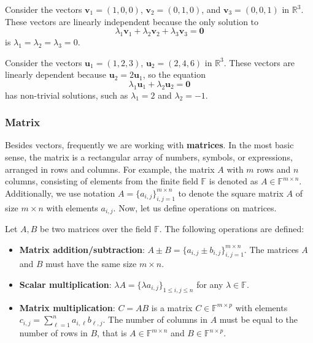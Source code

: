 \documentclass[../lecture-notes.tex]{subfiles}
\begin{document}
\begin{example}
    Consider the vectors $\mathbf{v}_1 = (1, 0, 0)$, $\mathbf{v}_2 = (0, 1, 0)$, and $\mathbf{v}_3 = (0, 0, 1)$ in $\mathbb{R}^3$. These vectors are linearly independent because the only solution to
    \begin{equation*}
        \lambda_1 \mathbf{v}_1 + \lambda_2 \mathbf{v}_2 + \lambda_3 \mathbf{v}_3 = \mathbf{0}
    \end{equation*}
    is $\lambda_1 = \lambda_2 = \lambda_3 = 0$.
\end{example}

\begin{example}
    Consider the vectors $\mathbf{u}_1 = (1, 2, 3)$, $\mathbf{u}_2 = (2, 4, 6)$ in $\mathbb{R}^3$. These vectors are linearly dependent because $\mathbf{u}_2 = 2\mathbf{u}_1$, so the equation
    \begin{equation*}
        \lambda_1 \mathbf{u}_1 + \lambda_2 \mathbf{u}_2 = \mathbf{0}
    \end{equation*}
    has non-trivial solutions, such as $\lambda_1 = 2$ and $\lambda_2 = -1$.
\end{example}

\subsubsection{Matrix}

Besides vectors, frequently we are working with \textbf{matrices}. In the most
basic sense, the matrix is a rectangular array of numbers, symbols, or
expressions, arranged in rows and columns. For example, the matrix $A$ with $m$
rows and $n$ columns, consisting of elements from the finite field $\mathbb{F}$
is denoted as $A \in \mathbb{F}^{m \times n}$. Additionally, we use notation $A
= \{a_{i,j}\}_{i,j=1}^{m \times n}$ to denote the square matrix $A$ of size $m
\times n$ with elements $a_{i,j}$. Now, let us define operations on matrices.

\begin{definition}
    Let $A,B$ be two matrices over the field $\mathbb{F}$. The following operations are defined:
    \begin{itemize}
        \item \textbf{Matrix addition/subtraction}: $A \pm B = \{a_{i,j} \pm b_{i,j}\}_{i,j=1}^{m \times n}$. The matrices $A$ and $B$ must have the same size $m \times n$.
        \item \textbf{Scalar multiplication}: $\lambda A = \{\lambda a_{i,j}\}_{1\leq i,j \leq n}$ for any $\lambda \in \mathbb{F}$.
        \item \textbf{Matrix multiplication}: $C = AB$ is a matrix $C \in \mathbb{F}^{m \times p}$ with elements $c_{i,j} = \sum_{\ell=1}^{n} a_{i,\ell}b_{\ell,j}$. The number of columns in $A$ must be equal to the number of rows in $B$, that is $A \in \mathbb{F}^{m \times n}$ and $B \in \mathbb{F}^{n \times p}$.
    \end{itemize}
\end{definition}
\end{document}
